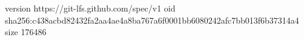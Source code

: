 version https://git-lfs.github.com/spec/v1
oid sha256:c438acbd82432fa2aa4ae4a8ba767a6f0001bb6080242afc7bb013f6b37314a4
size 176486
